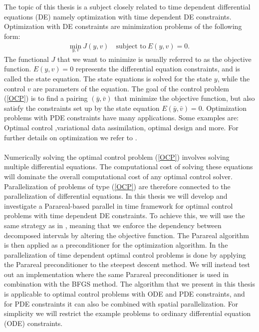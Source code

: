\\
\\
The topic of this thesis is a subject closely related to time dependent differential equations (DE) namely optimization with time dependent DE constraints. Optimization with DE constraints are minimization problems of the following form:
\begin{align}
\underset{y,v}{\text{min}} \ J(y,v) \quad \textrm{subject to} \ E(y,v)=0. \label{OCP}
\end{align}
The functional $J$ that we want to minimize is usually referred to as the objective function. $E(y,v)=0$ represents the differential equation constraints, and is called the state equation. The state equations is solved for the state $y$, while the control $v$ are parameters of the equation. The goal of the control problem (\ref{OCP}) is to find a pairing $(\bar y,\bar v)$ that minimize the objective function, but also satisfy the constraints set up by the state equation $ E(\bar y,\bar v)=0$. Optimization problems with PDE constraints have many applications. Some examples are: Optimal control ,variational data assimilation, optimal design and more. For further details on optimization we refer to \cite{hinze2008optimization}.
\\
\\
Numerically solving the optimal control problem (\ref{OCP}) involves solving multiple differential equations. The computational cost of solving these equations will dominate the overall computational cost of any optimal control solver. Parallelization of problems of type (\ref{OCP}) are therefore connected to the parallelization of differential equations. In this thesis we will develop and investigate a Parareal-based parallel in time framework for optimal control problems with time dependent DE constraints. To achieve this, we will use the same strategy as in \cite{maday2002parareal}, meaning that we enforce the dependency between decomposed intervals by altering the objective function. The Parareal algorithm is then applied as a preconditioner for the optimization algorithm. In \cite{maday2002parareal} the parallelization of time dependent optimal control problems is done by applying the Parareal preconditioner to the steepest descent method. We will instead test out an implementation where the same Parareal preconditioner is used in combination with the BFGS method. The algorithm that we present in this thesis is applicable to optimal control problems with ODE and PDE constraints, and for PDE constraints it can also be combined with spatial parallelization. For simplicity we will restrict the example problems to ordinary differential equation (ODE) constraints.
